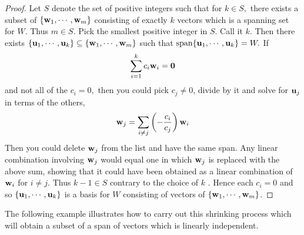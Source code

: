 \begin{proof}
Let $S$ denote the set of positive integers such that for $
k\in S,$ there exists a subset of $\{{\bf w}_{1},\cdots ,{\bf w}_{m}\} $ consisting of exactly $k$ vectors
which is a spanning set for $W$. Thus $m\in S$. Pick the smallest positive
integer in $S$. Call it $k$. Then there exists $\{{\bf u}_{1},\cdots ,
{\bf u}_{k}\} \subseteq \{{\bf w}_{1},\cdots ,{\bf w}
_{m}\} $ such that $\mbox{span}\{{\bf u}_{1},\cdots ,{\bf u}
_{k}\} =W.$ If 
\begin{equation*}
\sum_{i=1}^{k}c_{i}{\bf w}_{i}={\bf 0}
\end{equation*}
and not all of the $c_{i}=0,$ then you could pick $c_{j}\neq 0$, divide by
it and solve for ${\bf u}_{j}$ in terms of the others, 
\begin{equation*}
{\bf w}_{j}=\sum_{i\neq j}\left( -\frac{c_{i}}{c_{j}}\right) {\bf w}_{i}
\end{equation*}
Then you could delete ${\bf w}_{j}$ from the list and have the same span. Any linear combination involving ${\bf w}_{j}$ would equal one in which ${\bf w}_{j}$ is replaced with the
above sum, showing that it could have been obtained as a linear combination
of ${\bf w}_{i}$ for $i\neq j$. Thus $k-1\in S$ contrary to the choice of $k$
. Hence each $c_{i}=0$ and so $\{{\bf u}_{1},\cdots ,{\bf u}
_{k}\} $ is a basis for $W$ consisting of vectors of $\{{\bf w}
_{1},\cdots ,{\bf w}_{m}\} $.
\end{proof}

The following example illustrates how to carry out this shrinking process which will obtain a subset of a span
of vectors which is linearly independent.

